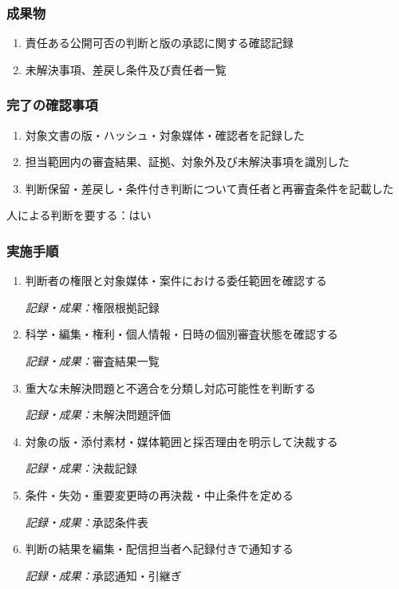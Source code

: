 \documentclass[a4paper,11pt]{article}
\begin{document}
\subsubsection*{成果物}
\begin{enumerate}[leftmargin=2em,itemsep=0.35em]
\item 責任ある公開可否の判断と版の承認に関する確認記録
\item 未解決事項、差戻し条件及び責任者一覧
\end{enumerate}
\subsubsection*{完了の確認事項}
\begin{enumerate}[leftmargin=2em,itemsep=0.35em]
\item 対象文書の版・ハッシュ・対象媒体・確認者を記録した
\item 担当範囲内の審査結果、証拠、対象外及び未解決事項を識別した
\item 判断保留・差戻し・条件付き判断について責任者と再審査条件を記載した
\end{enumerate}
\par 人による判断を要する：はい\par\medskip
\subsubsection*{実施手順}
\begin{enumerate}[leftmargin=2em,itemsep=0.65em]
\item 判断者の権限と対象媒体・案件における委任範囲を確認する\par\noindent\textit{記録・成果：}権限根拠記録\nobreak\smallskip
\item 科学・編集・権利・個人情報・日時の個別審査状態を確認する\par\noindent\textit{記録・成果：}審査結果一覧\nobreak\smallskip
\item 重大な未解決問題と不適合を分類し対応可能性を判断する\par\noindent\textit{記録・成果：}未解決問題評価\nobreak\smallskip
\item 対象の版・添付素材・媒体範囲と採否理由を明示して決裁する\par\noindent\textit{記録・成果：}決裁記録\nobreak\smallskip
\item 条件・失効・重要変更時の再決裁・中止条件を定める\par\noindent\textit{記録・成果：}承認条件表\nobreak\smallskip
\item 判断の結果を編集・配信担当者へ記録付きで通知する\par\noindent\textit{記録・成果：}承認通知・引継ぎ\nobreak\smallskip
\end{enumerate}
\end{document}
